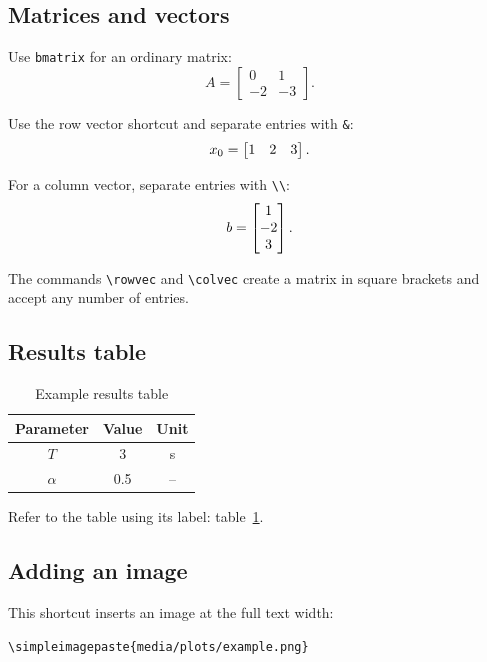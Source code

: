 \subsection{Matrices and vectors}
Use \texttt{bmatrix} for an ordinary matrix:
\begin{equation}
    A = \begin{bmatrix}
        0 & 1 \\
        -2 & -3
    \end{bmatrix}.
\end{equation}

Use the row vector shortcut and separate entries with \texttt{\&}:
\begin{equation}
    x_0 = \begin{bmatrix}1 & 2 & 3\end{bmatrix}.
\end{equation}

For a column vector, separate entries with \texttt{\textbackslash\textbackslash}:
\begin{equation}
    b = \begin{bmatrix}1 \\ -2 \\ 3\end{bmatrix}.
\end{equation}

The commands \texttt{\textbackslash rowvec} and \texttt{\textbackslash colvec}
create a matrix in square brackets and accept any number of entries.

\subsection{Results table}
\begin{table}[ht!]
    \centering
    \begin{tabular}{|c|c|c|}
        \hline
        Parameter & Value & Unit \\
        \hline
        $T$ & 3 & s \\
        $\alpha$ & 0.5 & -- \\
        \hline
    \end{tabular}
    \caption{Example results table}
    \label{tab:taskN_example}
\end{table}
Refer to the table using its label: table~\ref{tab:taskN_example}.

\subsection{Adding an image}
This shortcut inserts an image at the full text width:
\begin{verbatim}
\simpleimagepaste{media/plots/example.png}
\end{verbatim}

